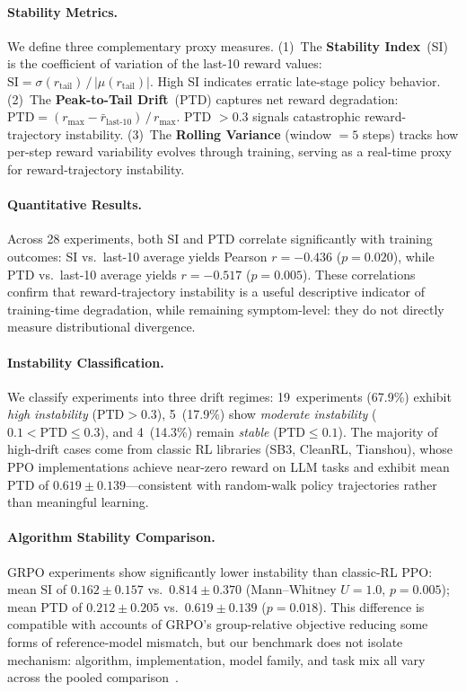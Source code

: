 \documentclass{article}
\begin{document}
\paragraph{Stability Metrics.}
We define three complementary proxy measures.
(1)~The \textbf{Stability Index}~(SI) is the coefficient of variation of
the last-10 reward values:
$\mathrm{SI} = \sigma(r_{\text{tail}}) \,/\, |\mu(r_{\text{tail}})|$.
High SI indicates erratic late-stage policy behavior.
(2)~The \textbf{Peak-to-Tail Drift}~(PTD) captures net reward degradation:
$\mathrm{PTD} = (r_{\max} - \bar{r}_{\text{last-10}}) \,/\, r_{\max}$.
PTD $> 0.3$ signals catastrophic reward-trajectory instability.
(3)~The \textbf{Rolling Variance} (window $= 5$ steps) tracks how
per-step reward variability evolves through training, serving as a
real-time proxy for reward-trajectory instability.

\paragraph{Quantitative Results.}
Across 28 experiments, both SI and PTD correlate significantly with
training outcomes:
SI vs.\ last-10 average yields Pearson $r = -0.436$ ($p = 0.020$),
while PTD vs.\ last-10 average yields $r = -0.517$ ($p = 0.005$).
These correlations confirm that reward-trajectory instability is a useful
descriptive indicator of training-time degradation, while remaining
symptom-level: they do not directly measure distributional divergence.

\paragraph{Instability Classification.}
We classify experiments into three drift regimes:
19~experiments (67.9\%) exhibit \emph{high instability}
($\text{PTD} > 0.3$), 5~(17.9\%) show \emph{moderate instability}
($0.1 < \text{PTD} \leq 0.3$), and 4~(14.3\%) remain \emph{stable}
($\text{PTD} \leq 0.1$). The majority of high-drift cases come from
classic RL libraries (SB3, CleanRL, Tianshou), whose PPO
implementations achieve near-zero reward on LLM tasks and exhibit
mean PTD of $0.619 \pm 0.139$---consistent with random-walk policy
trajectories rather than meaningful learning.

\paragraph{Algorithm Stability Comparison.}
GRPO experiments show significantly lower instability than classic-RL PPO:
mean SI of $0.162 \pm 0.157$ vs.\ $0.814 \pm 0.370$
(Mann--Whitney $U = 1.0$, $p = 0.005$); mean PTD of $0.212 \pm 0.205$
vs.\ $0.619 \pm 0.139$ ($p = 0.018$).
This difference is compatible with accounts of GRPO's group-relative
objective reducing some forms of reference-model mismatch, but our benchmark
does not isolate mechanism: algorithm, implementation, model family, and task
mix all vary across the pooled comparison~\citep{shao2024deepseekmath}.
\end{document}

